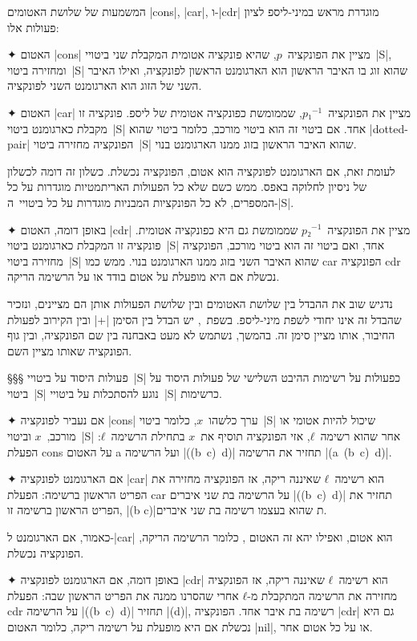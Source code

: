 המשמעות של שלושת האטומים \T|cons|, \T|car|, ו-\T|cdr| מוגדרת מראש במיני-ליספ
לציון פעולות אלו:

\begin{enumerate}
  ✦ האטום \T|cons| מציין את הפונקציה~$p$, שהיא פונקציה אטומית המקבלת שני
  ביטויי~\E|S|, ומחזירה ביטוי~\E|S| שהוא זוג בו האיבר הראשון הוא הארגומנט
  הראשון לפונקציה, ואילו האיבר השני של הזוג הוא הארגומנט השני לפונקציה.

  ✦ האטום \T|car| מציין את הפונקציה~$p₁^{-1}$, שממומשת כפונקציה אטומית של
  ליספ. פונקציה זו מקבלת כארגומנט ביטוי~\E|S| אחד. אם ביטוי זה הוא ביטוי מורכב,
  כלומר ביטוי שהוא \E|dotted-pair| הפונקציה מחזירה ביטוי~\E|S| שהוא האיבר
  הראשון בזוג ממנו הארגומנט בנוי.

  לעומת זאת, אם הארגומנט לפונקציה הוא אטום, הפונקציה נכשלת. כשלון זה דומה
  לכשלון של ניסיון לחלוקה באפס. ממש כשם שלא כל הפעולות האריתמטיות מוגדרות על כל
  המספרים, לא כל הפונקציות המבניות מוגדרות על כל ביטויי~ה-\E|S|.

  ✦ באופן דומה, האטום \T|cdr| מציין את הפונקציה~$p₂^{-1}$ שממומשת גם היא
  כפונקציה אטומית. פונקציה זו המקבלת כארגומנט ביטוי~\E|S| אחד, ואם ביטוי זה
  הוא ביטוי מורכב, הפונקציה מחזירה ביטוי~\E|S| שהוא האיבר השני בזוג ממנו
  הארגומנט בנוי. ממש כמו car הפונקציה cdr נכשלת אם היא מופעלת על אטום בודד
  או על הרשימה הריקה.
\end{enumerate}

נדגיש שוב את ההבדל בין שלושת האטומים ובין שלושת הפעולות אותן הם מציינים, ונזכיר
שהבדל זה אינו יחודי לשפת מיני-ליספ. בשפת~\CPL, יש הבדל בין הסימן \T|+| ובין
הקירוב לפעולת החיבור, אותו מציין סימן זה. בהמשך, נשתמש לא מעט באבחנה בין שם
הפונקציה, ובין גוף הפונקציה שאותו מציין השם.

§§§ פעולות היסוד על ביטויי~\E|S| כפעולות על רשימות
ההיבט השלישי של פעולות היסוד על ביטוי~\E|S| נוגע להסתכלות על ביטויי~\E|S|
כרשימות.

\begin{enumerate}
  ✦ אם נעביר לפונקציה \T|cons| ערך כלשהו~$x$, כלומר ביטוי~\E|S| שיכול להיות
  אטומי או מורכב,~$x$ וביטוי~\E|S| אחר שהוא רשימה~$ℓ$, אזי הפונקציה תוסיף את~$x$
  בתחילת הרשימה~$ℓ$: הפעלת cons על האטום a ועל הרשימה \E|((b~c)~d)| תחזיר את
  הרשימה \E|(a~(b~c)~d)|.

  ✦ אם הארגומנט לפונקציה \T|car| הוא רשימה~$ℓ$ שאיננה ריקה, אז הפונקציה מחזירה
  את הפריט הראשון ברשימה: הפעלת car על הרשימה בת שני איברים \E|((b~c)~d)| תחזיר
  את הפריט הראשון ברשימה זו, \E|(b c)|ת שהוא בעצמו רשימה בת שני איברים.

  כאמור, אם הארגומנט ל-\E|car| הוא אטום, ואפילו יהא זה האטום ,
  כלומר הרשימה הריקה, הפונקציה נכשלת.

  ✦ באופן דומה, אם הארגומנט לפונקציה \T|cdr| הוא רשימה~$ℓ$ שאיננה ריקה, אז
  הפונקציה מחזירה את הרשימה המתקבלת מ-$ℓ$ אחרי שהסרנו ממנה את הפריט הראשון שבה:
  הפעלת cdr על הרשימה \E|((b~c)~d)| תחזיר \E|(d)|, רשימה בת איבר אחד. הפונקציה
  \E|cdr| גם היא נכשלת אם היא מופעלת על רשימה ריקה, כלומר האטום \E|nil|, או על
  כל אטום אחר.
\end{enumerate}

